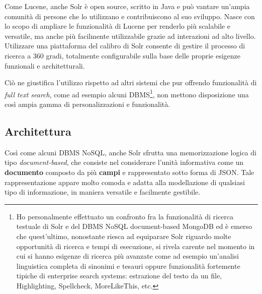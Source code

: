 \vspace{1em}
Come Lucene, anche Solr è open source, scritto in Java e può vantare un’ampia comunità di persone che lo utilizzano e contribuiscono al suo sviluppo. Nasce con lo scopo di ampliare le funzionalità di Lucene per renderlo più scalabile e versatile, ma anche più facilmente utilizzabile grazie ad interazioni ad alto livello. Utilizzare una piattaforma del calibro di Solr consente di gestire il processo di ricerca a 360 gradi, totalmente configurabile sulla base delle proprie esigenze funzionali e architetturali. 

\vspace{1em}
Ciò ne giustifica l’utilizzo rispetto ad altri sistemi che pur offrendo funzionalità di \textit{full text search}, come ad esempio alcuni DBMS\footnote{Ho personalmente effettuato un confronto fra la funzionalità di ricerca testuale di Solr e del DBMS NoSQL document-based MongoDB ed è emerso che quest’ultimo, nonostante riesca ad equiparare Solr riguardo molte opportunità di ricerca e tempi di esecuzione, si rivela carente nel momento in cui si hanno esigenze di ricerca più avanzate come ad esempio un’analisi linguistica completa di sinonimi e tesauri oppure funzionalità fortemente tipiche di enterprise search systems: estrazione del testo da un file, Highlighting, Spellcheck, MoreLikeThis, etc.}, non mettono disposizione una così ampia gamma di personalizzazioni e funzionalità.



\subsection{Architettura}

Così come alcuni DBMS NoSQL, anche Solr sfrutta una memorizzazione logica di tipo \textit{document-based}, che consiste nel considerare l’unità informativa come un \textbf{documento} composto da più \textbf{campi} e rappresentato sotto forma di JSON. Tale rappresentazione appare molto comoda e adatta alla modellazione di qualsiasi tipo di informazione, in maniera versatile e facilmente gestibile.


